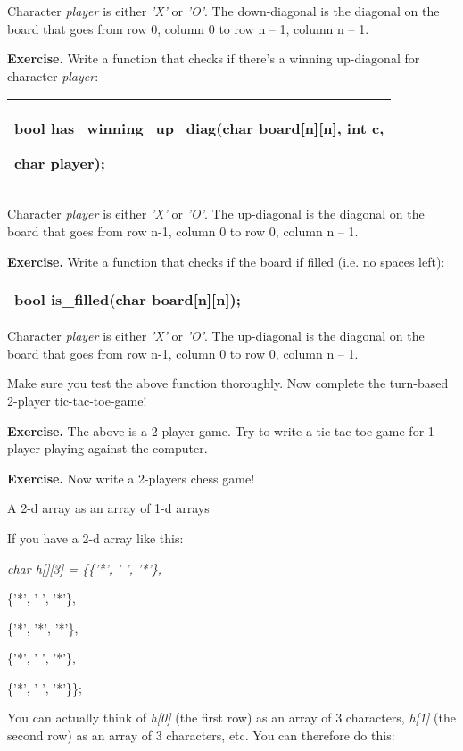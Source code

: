 \documentclass[
]{article}
\begin{document}
Character \emph{player} is either \emph{'X'} or \emph{'O'}. The
down-diagonal is the diagonal on the board that goes from row 0, column
0 to row n -- 1, column n -- 1.

\textbf{Exercise.} Write a function that checks if there's a winning
up-diagonal for character \emph{player}:

\begin{longtable}[]{@{}l@{}}
\toprule
\endhead
\begin{minipage}[t]{0.97\columnwidth}\raggedright
bool has\_winning\_up\_diag(char board{[}n{]}{[}n{]}, int c,

char player);\strut
\end{minipage}\tabularnewline
\bottomrule
\end{longtable}

Character \emph{player} is either \emph{'X'} or \emph{'O'}. The
up-diagonal is the diagonal on the board that goes from row n-1, column
0 to row 0, column n -- 1.

\textbf{Exercise.} Write a function that checks if the board if filled
(i.e. no spaces left):

\begin{longtable}[]{@{}l@{}}
\toprule
\endhead
bool is\_filled(char board{[}n{]}{[}n{]});\tabularnewline
\bottomrule
\end{longtable}

Character \emph{player} is either \emph{'X'} or \emph{'O'}. The
up-diagonal is the diagonal on the board that goes from row n-1, column
0 to row 0, column n -- 1.

Make sure you test the above function thoroughly. Now complete the
turn-based 2-player tic-tac-toe-game!

\textbf{Exercise.} The above is a 2-player game. Try to write a
tic-tac-toe game for 1 player playing against the computer.

\textbf{Exercise.} Now write a 2-players chess game!

A 2-d array as an array of 1-d arrays

If you have a 2-d array like this:

\emph{char h{[}{]}{[}3{]} = \{\{'*', ' ', '*'\},}

\{'*', ' ', '*'\},

\{'*', '*', '*'\},

\{'*', ' ', '*'\},

\{'*', ' ', '*'\}\};

You can actually think of \emph{h{[}0{]}} (the first row) as an array of
3 characters, \emph{h{[}1{]}} (the second row) as an array of 3
characters, etc. You can therefore do this:
\end{document}
